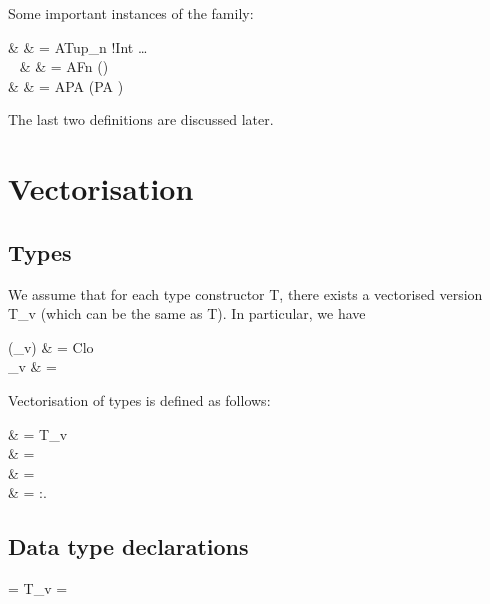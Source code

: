 \documentclass{article}
\begin{document}
Some important instances of the \<\parr{\cdot}\> family:

\begin{haskell}
 &  
  & = ATup_n !Int  \ldots {} \\
~ &  \parr{\alpha\to\beta}
  & = AFn (\parr{\alpha}\to\parr{\beta}) \\
 &  
  & = APA (PA \alpha)
\end{haskell}

The last two definitions are discussed later.

\section*{Vectorisation}

\subsection*{Types}

We assume that for each type constructor \<T\>, there exists a vectorised
version \<T_v\> (which can be the same as \<T\>). In particular, we have
\begin{haskell}
({\to}_v)       & = Clo \\
\pparr{\cdot}_v & = \parr{\cdot}
\end{haskell}

Vectorisation of types is defined as follows:

\begin{haskell}
      & = T_v \\
\vect{\alpha} & = \alpha \\
\vect{\sigma \phi} & = \vect{\sigma} \vect{\phi} \\
 & = \forall\alpha:\kappa.\patype{\alpha:\kappa}\to\vect{\sigma}
\end{haskell}

\subsection*{Data type declarations}

\begin{haskell}
 =  T_v =
\end{haskell}
\end{document}
